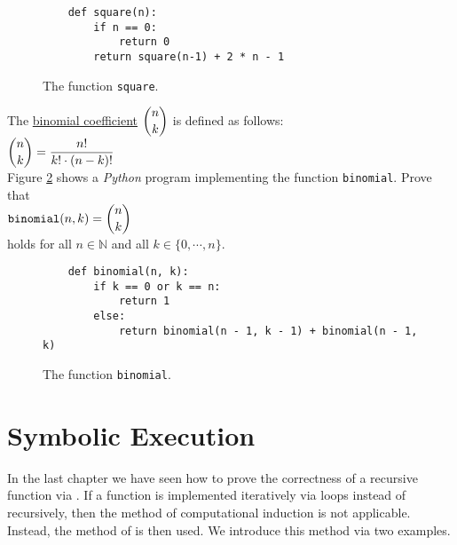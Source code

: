 \begin{figure}[!ht]
\centering
\begin{verbatim}
    def square(n):
        if n == 0:
            return 0
        return square(n-1) + 2 * n - 1 
\end{verbatim}
\vspace*{-0.3cm}
\caption{The function \texttt{square}.}
\label{fig:square}
\end{figure}

\exerciseEng
The \href{https://en.wikipedia.org/wiki/Binomial_coefficient}{binomial coefficient} $\displaystyle {n \choose k}$ is defined as follows:
\\[0.2cm]
\hspace*{1.3cm}
$\displaystyle {n \choose k} = \frac{n!}{k! \cdot (n-k)!}$
\\[0.2cm]
Figure \ref{fig:binomial} shows a \textsl{Python} program implementing the function \texttt{binomial}.  Prove
that 
\\[0.2cm]
\hspace*{1.3cm}
$\displaystyle \mathtt{binomial}(n, k) = {n \choose k}$
\\[0.2cm]
holds for all $n \in \mathbb{N}$ and all $k \in \{ 0, \cdots, n \}$. \eox

\begin{figure}[!ht]
\centering
\begin{verbatim}
    def binomial(n, k):
        if k == 0 or k == n:
            return 1
        else:
            return binomial(n - 1, k - 1) + binomial(n - 1, k)                
\end{verbatim}
\vspace*{-0.3cm}
\caption{The function \texttt{binomial}.}
\label{fig:binomial}
\end{figure}



\section{Symbolic Execution}
In the last chapter we have seen how to prove the correctness of a recursive function via
.  If a function is implemented iteratively via loops instead of recursively,
then the method of computational induction is not applicable.   Instead, the method of 
  is then used.
We introduce this method via two examples.

